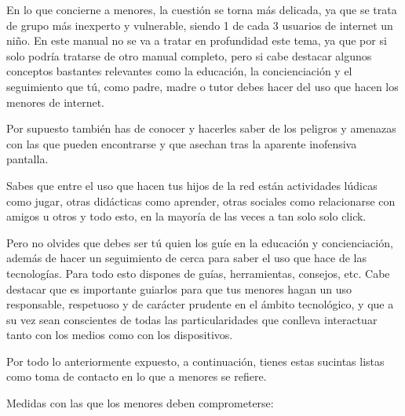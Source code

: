 \documentclass[
  a4paper,
  openany]{book}
\begin{document}
En lo que concierne a menores, la cuestión se torna más delicada, ya que se trata de grupo más inexperto y vulnerable, siendo 1 de cada 3 usuarios de internet un niño. En este manual no se va a tratar en profundidad este tema, ya que por si solo podría tratarse de otro manual completo, pero si cabe destacar algunos conceptos bastantes relevantes como la educación, la concienciación y el seguimiento que tú, como padre, madre o tutor debes hacer del uso que hacen los menores de internet.

Por supuesto también has de conocer y hacerles saber de los peligros y amenazas con las que pueden encontrarse y que asechan tras la aparente inofensiva pantalla.

Sabes que entre el uso que hacen tus hijos de la red están actividades lúdicas como jugar, otras didácticas como aprender, otras sociales como relacionarse con amigos u otros y todo esto, en la mayoría de las veces a tan solo solo click.

Pero no olvides que debes ser tú quien los guíe en la educación y concienciación, además de hacer un seguimiento de cerca para saber el uso que hace de las tecnologías. Para todo esto dispones de guías, herramientas, consejos, etc. Cabe destacar que es importante guiarlos para que tus menores hagan un uso responsable, respetuoso y de carácter prudente en el ámbito tecnológico, y que a su vez sean conscientes de todas las particularidades que conlleva interactuar tanto con los medios como con los dispositivos.

Por todo lo anteriormente expuesto, a continuación, tienes estas sucintas listas como toma de contacto en lo que a menores se refiere.

Medidas con las que los menores deben comprometerse:
\end{document}
